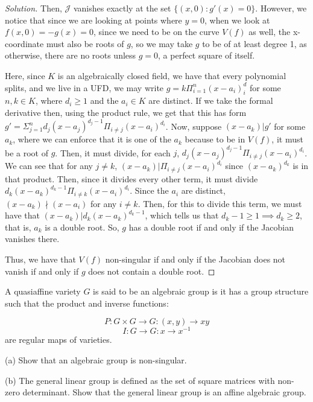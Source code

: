 \documentclass[10pt]{article}
\newenvironment{problem}[2][Problem]{\begin{trivlist}
\item[\hskip \labelsep {\bfseries #1}\hskip \labelsep {\bfseries #2.}]}{\end{trivlist}}
\begin{document}
\begin{proof}[Solution]
Then, $\mathcal{J}$ vanishes exactly at the set $\{ (x,0) : g'(x) = 0 \}$. However, we notice that since we are looking at points where $y = 0$, when we look at $f(x,0) = -g(x) = 0$, since we need to be on the curve $V(f)$ as well, the x-coordinate must also be roots of $g$, so we may take $g$ to be of at least degree 1, as otherwise, there are no roots unless $g = 0$, a perfect square of itself. 

Here, since $K$ is an algebraically closed field, we have that every polynomial splits, and we live in a UFD, we may write $g = k\Pi_{i=1}^n (x-a_i)^d_i$ for some $n, k \in K$, where $d_i \geq 1$ and the $a_i \in K$ are distinct. If we take the formal derivative then, using the product rule, we get that this has form $g' = \Sigma_{j=1}^n   d_j(x-a_j)^{d_j - 1}\Pi_{i \not = j} (x-a_i)^{d_i}$. Now, suppose $(x-a_k) | g'$ for some $a_k$, where we can enforce that it is one of the $a_k$ because to be in $V(f)$, it must be a root of $g$. Then, it must divide, for each $j$, $d_j(x-a_j)^{d_j - 1} \Pi_{i \not = j} (x-a_i)^{d_i}$. We can see that for any $j \not = k$, $(x-a_k) | \Pi_{i \not = j} (x-a_i)^{d_i}$ since $(x-a_k)^{d_k}$ is in that product. Then, since it divides every other term, it must divide $d_k (x-a_k)^{d_k -1}\Pi_{i \not = k} (x-a_i)^{d_i}$. Since the $a_i$ are distinct, $(x - a_k) \nmid (x - a_i)$ for any $i \not = k$. Then, for this to divide this term, we must have that $(x-a_k) | d_k (x-a_k)^{d_k - 1}$, which tells us that $d_k -1 \geq 1 \implies d_k \geq 2$, that is, $a_k$ is a double root. So, $g$ has a double root if and only if the Jacobian vanishes there. 

Thus, we have that $V(f)$ non-singular if and only if the Jacobian does not vanish if and only if $g$ does not contain a double root.


\end{proof}

\begin{problem}{8.3}

A quasiaffine variety $G$ is said to be an algebraic group is it has a group structure such that the product and inverse functions:

$$ P: G \times G \to G : (x,y) \to xy $$
$$ I: G \to G : x \to x^{-1}$$
are regular maps of varieties.

(a) Show that an algebraic group is non-singular.

(b) The general linear group is defined as the set of square matrices with non-zero determinant. Show that the general linear group is an affine algebraic group.

\end{problem}
\end{document}

